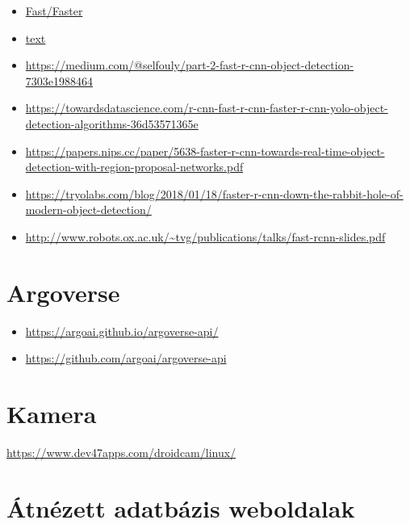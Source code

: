 \documentclass[12pt]{report}
\begin{document}
\begin{itemize}
\item \href{https://lilianweng.github.io/lil-log/2017/12/31/object-recognition-for-dummies-part-3.html}{Fast/Faster} 


\item \href{https://arxiv.org/pdf/1504.08083.pdf}{text} 

\item \url{https://medium.com/@selfouly/part-2-fast-r-cnn-object-detection-7303e1988464}
\item \url{https://towardsdatascience.com/r-cnn-fast-r-cnn-faster-r-cnn-yolo-object-detection-algorithms-36d53571365e}
\item \url{https://papers.nips.cc/paper/5638-faster-r-cnn-towards-real-time-object-detection-with-region-proposal-networks.pdf}
\item \url{https://tryolabs.com/blog/2018/01/18/faster-r-cnn-down-the-rabbit-hole-of-modern-object-detection/}
\item \url{http://www.robots.ox.ac.uk/~tvg/publications/talks/fast-rcnn-slides.pdf}
\end{itemize}

\chapter{Argoverse}
\begin{itemize}
	\item \url{https://argoai.github.io/argoverse-api/}
	\item \url{https://github.com/argoai/argoverse-api}
\end{itemize}


\chapter{Kamera}
\url{https://www.dev47apps.com/droidcam/linux/}

\chapter{Átnézett adatbázis weboldalak}
\end{document}
